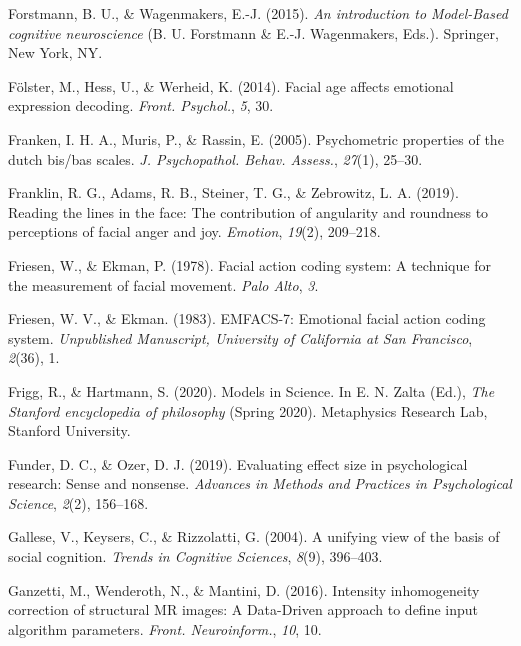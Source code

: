 \documentclass[11pt,american,a4paper,oneside,]{memoir} %
\begin{document}
\leavevmode\hypertarget{ref-Forstmann2015-rz}{}%
Forstmann, B. U., \& Wagenmakers, E.-J. (2015). \emph{An introduction to Model-Based cognitive neuroscience} (B. U. Forstmann \& E.-J. Wagenmakers, Eds.). Springer, New York, NY.

\leavevmode\hypertarget{ref-Folster2014-zy}{}%
Fölster, M., Hess, U., \& Werheid, K. (2014). Facial age affects emotional expression decoding. \emph{Front. Psychol.}, \emph{5}, 30.

\leavevmode\hypertarget{ref-Franken2005-jg}{}%
Franken, I. H. A., Muris, P., \& Rassin, E. (2005). Psychometric properties of the dutch bis/bas scales. \emph{J. Psychopathol. Behav. Assess.}, \emph{27}(1), 25--30.

\leavevmode\hypertarget{ref-Franklin2019-qo}{}%
Franklin, R. G., Adams, R. B., Steiner, T. G., \& Zebrowitz, L. A. (2019). Reading the lines in the face: The contribution of angularity and roundness to perceptions of facial anger and joy. \emph{Emotion}, \emph{19}(2), 209--218.

\leavevmode\hypertarget{ref-Friesen1978-tp}{}%
Friesen, W., \& Ekman, P. (1978). Facial action coding system: A technique for the measurement of facial movement. \emph{Palo Alto}, \emph{3}.

\leavevmode\hypertarget{ref-Friesen1983-ft}{}%
Friesen, W. V., \& Ekman. (1983). EMFACS-7: Emotional facial action coding system. \emph{Unpublished Manuscript, University of California at San Francisco}, \emph{2}(36), 1.

\leavevmode\hypertarget{ref-Frigg2020-hp}{}%
Frigg, R., \& Hartmann, S. (2020). Models in Science. In E. N. Zalta (Ed.), \emph{The Stanford encyclopedia of philosophy} (Spring 2020). Metaphysics Research Lab, Stanford University.

\leavevmode\hypertarget{ref-Funder2019-ow}{}%
Funder, D. C., \& Ozer, D. J. (2019). Evaluating effect size in psychological research: Sense and nonsense. \emph{Advances in Methods and Practices in Psychological Science}, \emph{2}(2), 156--168.

\leavevmode\hypertarget{ref-gallese2004unifying}{}%
Gallese, V., Keysers, C., \& Rizzolatti, G. (2004). A unifying view of the basis of social cognition. \emph{Trends in Cognitive Sciences}, \emph{8}(9), 396--403.

\leavevmode\hypertarget{ref-Ganzetti2016-yy}{}%
Ganzetti, M., Wenderoth, N., \& Mantini, D. (2016). Intensity inhomogeneity correction of structural MR images: A Data-Driven approach to define input algorithm parameters. \emph{Front. Neuroinform.}, \emph{10}, 10.
\end{document}
